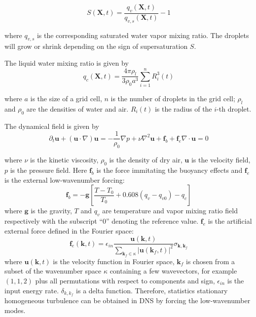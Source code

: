 \documentclass[draft,jgrga]{AGUTeX}
\begin{document}
\begin{article}
\begin{subequations}
\begin{equation}
S(\mathbf{X},t)=\frac{q_{v}(\mathbf{X},t)}{q_{v,s}(\mathbf{X},t)}-1\label{eq:Supersat}
\end{equation}

\end{subequations}

where $q_{v,s}$ is the corresponding saturated water vapor mixing ratio. The droplets
will grow or shrink depending on the sign of supersaturation $S$.

The liquid water mixing ratio is given by
\begin{equation}
q_{c}(\mathbf{X},t)=\frac{4\pi\rho_{l}}{3\rho_{0}a^{3}}\sum_{i=1}^{n}R_{i}^{3}(t)\label{eq:cloud_water}
\end{equation}


where $a$ is the size of a grid cell, $n$ is the number of droplets
in the grid cell; $\rho_{l}$ and $\rho_{0}$ are the densities of water 
and air. $R_{i}(t)$ is the radius of the $i$-th droplet.

The dynamical field is given by
\begin{subequations}

\begin{equation}
\partial_{t}\mathbf{u}+(\mathbf{u}\cdot\nabla)\mathbf{u}=-\frac{1}{\rho_{0}}\nabla p+\nu\nabla^2 \mathbf{u}+\mathbf{f}_b + \mathbf{f}_e\label{eq:NS1}
\end{equation}


\begin{equation}
\nabla\cdot \mathbf{u}=0\label{eq:NS2}
\end{equation}

\end{subequations}

where $\nu$ is the kinetic viscosity, $\rho_{0}$ is the density of
dry air, $\mathbf{u}$ is the velocity field, $p$ is the pressure field. Here $\mathbf{f}_b$ is the force immitating the buoyancy effects and $\mathbf{f}_e$ is the external low-wavenumber forcing:
\begin{equation}
\mathbf{f}_b= 
-\mathbf{g}[\frac{T-T_{0}}{T_0}+0.608(q_{v}-q_{v0})-q_{c}]
\label{eq:source_term}
\end{equation}
where $\mathbf{g}$ is the gravity, $T$ and $q_{v}$ are temperature
and vapor mixing ratio field respectively with the subscript ``$0$''
denoting the reference value. $\mathbf{f}_e$ is the artificial external force defined in the Fourier space:
\begin{equation}
\mathbf{f}_e(\mathbf{k},t) = \epsilon_{in}\frac{\mathbf{u}(\mathbf{k},t)}
{\sum_{\mathbf{k}_f\in \kappa}|\mathbf{u}(\mathbf{k}_f,t)|^2}
\sigma_{\mathbf{k},\mathbf{k}_f}
\end{equation}
where $\mathbf{u}(\mathbf{k},t)$ is the velocity function in Fourier space, $\mathbf{k}_f$ is chosen from a subset of the wavenumber space $\kappa$ containing a few wavevectors, for example $(1,1,2)$ plus all permutations with respect to components and sign, $\epsilon_{in}$ is the input energy rate. $\delta_{k,k_f}$ is a delta function. Therefore, statistics stationary homogeneous turbulence 
can be obtained in DNS by forcing the low-wavenumber modes.


\end{article}
\end{document}
